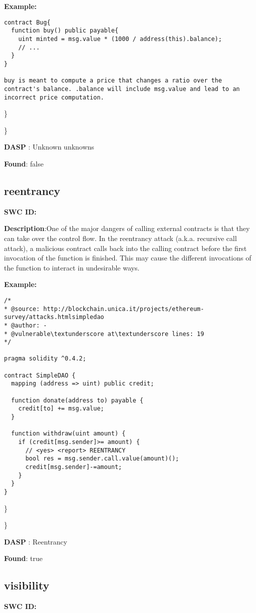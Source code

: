 \documentclass{article}
\begin{document}
\textbf{Example:} 
\begin{verbatim}
contract Bug{
  function buy() public payable{
    uint minted = msg.value * (1000 / address(this).balance);
    // ...
  }
}

buy is meant to compute a price that changes a ratio over the contract's balance. .balance will include msg.value and lead to an incorrect price computation.

\end{verbatim}\} 

\} 

\textbf{DASP} : Unknown unknowns

\textbf{Found}: false

\subsection{reentrancy} 
\textbf{SWC \textunderscore ID:} 

\textbf{Description}:One of the major dangers of calling external contracts is that they can take over the control flow. In the reentrancy attack (a.k.a. recursive call attack), a malicious contract calls back into the calling contract before the first invocation of the function is finished. This may cause the different invocations of the function to interact in undesirable ways.


\textbf{Example:} 
\begin{verbatim}
/*
* @source: http://blockchain.unica.it/projects/ethereum-survey/attacks.htmlsimpledao
* @author: -
* @vulnerable\textunderscore at\textunderscore lines: 19
*/

pragma solidity ^0.4.2;

contract SimpleDAO {
  mapping (address => uint) public credit;

  function donate(address to) payable {
    credit[to] += msg.value;
  }

  function withdraw(uint amount) {
    if (credit[msg.sender]>= amount) {
      // <yes> <report> REENTRANCY
      bool res = msg.sender.call.value(amount)();
      credit[msg.sender]-=amount;
    }
  }
}

\end{verbatim}\} 

\} 

\textbf{DASP} : Reentrancy

\textbf{Found}: true

\subsection{visibility} 
\textbf{SWC \textunderscore ID:} 
\end{document}
